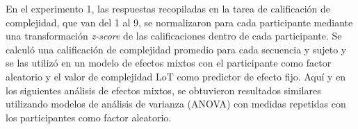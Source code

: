 En el experimento 1, las respuestas recopiladas en la tarea de calificación de complejidad, que van del 1 al 9, se normalizaron para cada participante mediante una transformación \textit{z-score} de las calificaciones dentro de cada participante. Se calculó una calificación de complejidad promedio para cada secuencia y sujeto y se las utilizó en un modelo de efectos mixtos con el participante como factor aleatorio y el valor de complejidad LoT como predictor de efecto fijo. Aquí y en los siguientes análisis de efectos mixtos, se obtuvieron resultados similares utilizando modelos de análisis de varianza (ANOVA) con medidas repetidas con los participantes como factor aleatorio.


